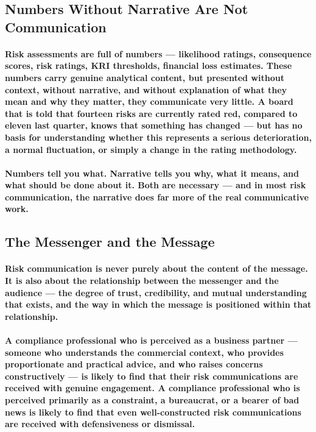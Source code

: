 \subsection{Numbers Without Narrative Are Not Communication}
\paragraph{Risk assessments are full of numbers — likelihood ratings, consequence scores, risk ratings, KRI thresholds, financial loss estimates. These numbers carry genuine analytical content, but presented without context, without narrative, and without explanation of what they mean and why they matter, they communicate very little. A board that is told that fourteen risks are currently rated red, compared to eleven last quarter, knows that something has changed — but has no basis for understanding whether this represents a serious deterioration, a normal fluctuation, or simply a change in the rating methodology.}
\paragraph{Numbers tell you what. Narrative tells you why, what it means, and what should be done about it. Both are necessary — and in most risk communication, the narrative does far more of the real communicative work.}

\subsection{The Messenger and the Message}
\paragraph{Risk communication is never purely about the content of the message. It is also about the relationship between the messenger and the audience — the degree of trust, credibility, and mutual understanding that exists, and the way in which the message is positioned within that relationship.}
\paragraph{A compliance professional who is perceived as a business partner — someone who understands the commercial context, who provides proportionate and practical advice, and who raises concerns constructively — is likely to find that their risk communications are received with genuine engagement. A compliance professional who is perceived primarily as a constraint, a bureaucrat, or a bearer of bad news is likely to find that even well-constructed risk communications are received with defensiveness or dismissal.}
